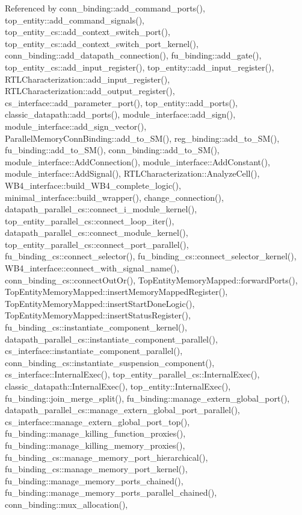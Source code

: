 Referenced by conn\+\_\+binding\+::add\+\_\+command\+\_\+ports(), top\+\_\+entity\+::add\+\_\+command\+\_\+signals(), top\+\_\+entity\+\_\+cs\+::add\+\_\+context\+\_\+switch\+\_\+port(), top\+\_\+entity\+\_\+cs\+::add\+\_\+context\+\_\+switch\+\_\+port\+\_\+kernel(), conn\+\_\+binding\+::add\+\_\+datapath\+\_\+connection(), fu\+\_\+binding\+::add\+\_\+gate(), top\+\_\+entity\+\_\+cs\+::add\+\_\+input\+\_\+register(), top\+\_\+entity\+::add\+\_\+input\+\_\+register(), R\+T\+L\+Characterization\+::add\+\_\+input\+\_\+register(), R\+T\+L\+Characterization\+::add\+\_\+output\+\_\+register(), cs\+\_\+interface\+::add\+\_\+parameter\+\_\+port(), top\+\_\+entity\+::add\+\_\+ports(), classic\+\_\+datapath\+::add\+\_\+ports(), module\+\_\+interface\+::add\+\_\+sign(), module\+\_\+interface\+::add\+\_\+sign\+\_\+vector(), Parallel\+Memory\+Conn\+Binding\+::add\+\_\+to\+\_\+\+S\+M(), reg\+\_\+binding\+::add\+\_\+to\+\_\+\+S\+M(), fu\+\_\+binding\+::add\+\_\+to\+\_\+\+S\+M(), conn\+\_\+binding\+::add\+\_\+to\+\_\+\+S\+M(), module\+\_\+interface\+::\+Add\+Connection(), module\+\_\+interface\+::\+Add\+Constant(), module\+\_\+interface\+::\+Add\+Signal(), R\+T\+L\+Characterization\+::\+Analyze\+Cell(), W\+B4\+\_\+interface\+::build\+\_\+\+W\+B4\+\_\+complete\+\_\+logic(), minimal\+\_\+interface\+::build\+\_\+wrapper(), change\+\_\+connection(), datapath\+\_\+parallel\+\_\+cs\+::connect\+\_\+i\+\_\+module\+\_\+kernel(), top\+\_\+entity\+\_\+parallel\+\_\+cs\+::connect\+\_\+loop\+\_\+iter(), datapath\+\_\+parallel\+\_\+cs\+::connect\+\_\+module\+\_\+kernel(), top\+\_\+entity\+\_\+parallel\+\_\+cs\+::connect\+\_\+port\+\_\+parallel(), fu\+\_\+binding\+\_\+cs\+::connect\+\_\+selector(), fu\+\_\+binding\+\_\+cs\+::connect\+\_\+selector\+\_\+kernel(), W\+B4\+\_\+interface\+::connect\+\_\+with\+\_\+signal\+\_\+name(), conn\+\_\+binding\+\_\+cs\+::connect\+Out\+Or(), Top\+Entity\+Memory\+Mapped\+::forward\+Ports(), Top\+Entity\+Memory\+Mapped\+::insert\+Memory\+Mapped\+Register(), Top\+Entity\+Memory\+Mapped\+::insert\+Start\+Done\+Logic(), Top\+Entity\+Memory\+Mapped\+::insert\+Status\+Register(), fu\+\_\+binding\+\_\+cs\+::instantiate\+\_\+component\+\_\+kernel(), datapath\+\_\+parallel\+\_\+cs\+::instantiate\+\_\+component\+\_\+parallel(), cs\+\_\+interface\+::instantiate\+\_\+component\+\_\+parallel(), conn\+\_\+binding\+\_\+cs\+::instantiate\+\_\+suspension\+\_\+component(), cs\+\_\+interface\+::\+Internal\+Exec(), top\+\_\+entity\+\_\+parallel\+\_\+cs\+::\+Internal\+Exec(), classic\+\_\+datapath\+::\+Internal\+Exec(), top\+\_\+entity\+::\+Internal\+Exec(), fu\+\_\+binding\+::join\+\_\+merge\+\_\+split(), fu\+\_\+binding\+::manage\+\_\+extern\+\_\+global\+\_\+port(), datapath\+\_\+parallel\+\_\+cs\+::manage\+\_\+extern\+\_\+global\+\_\+port\+\_\+parallel(), cs\+\_\+interface\+::manage\+\_\+extern\+\_\+global\+\_\+port\+\_\+top(), fu\+\_\+binding\+::manage\+\_\+killing\+\_\+function\+\_\+proxies(), fu\+\_\+binding\+::manage\+\_\+killing\+\_\+memory\+\_\+proxies(), fu\+\_\+binding\+\_\+cs\+::manage\+\_\+memory\+\_\+port\+\_\+hierarchical(), fu\+\_\+binding\+\_\+cs\+::manage\+\_\+memory\+\_\+port\+\_\+kernel(), fu\+\_\+binding\+::manage\+\_\+memory\+\_\+ports\+\_\+chained(), fu\+\_\+binding\+::manage\+\_\+memory\+\_\+ports\+\_\+parallel\+\_\+chained(), conn\+\_\+binding\+::mux\+\_\+allocation(), 